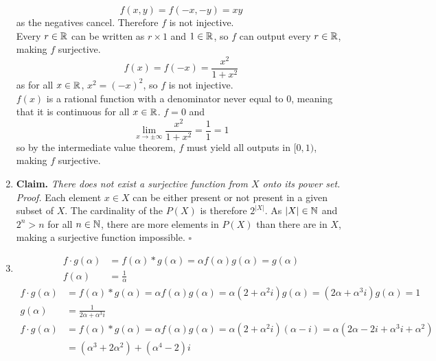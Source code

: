 \documentclass[../MATH145.tex]{subfiles}
\begin{document}
\begin{enumerate}
\begin{tasks}
\[							f(x, y) = f(-x, -y)
								= xy
						\]
						as the negatives cancel. Therefore \(f\) is not injective. \\
						Every \(r \in \mathbb{R}\) can be written as \(r \times 1\) and \(1 \in \mathbb{R}\), so \(f\) can output every \(r \in \mathbb{R}\), making \(f\) surjective.
					\task
						\[
							f(x) = f(-x)
								= \frac{x^2}{1 + x^2}
						\]
						as for all \(x \in \mathbb{R}\), \(x^2 = (-x)^2\), so \(f\) is not injective. \\
						\(f(x)\) is a rational function with a denominator never equal to 0, meaning that it is continuous for all \(x \in \mathbb{R}\). \(f = 0\) and 
							\[
								\lim_{x \to \pm\infty} \frac{x^2}{1 + x^2} = \frac{1}{1}
									= 1
							\]
							so by the intermediate value theorem, \(f\) must yield all outputs in \([0, 1)\), making \(f\) surjective.
				\end{tasks}
			\item
				\textbf{Claim.} \textit{There does not exist a surjective function from \(X\) onto its power set.} \\
					\textit{Proof.}
						Each element \(x \in X\) can be either present or not present in a given subset of \(X\). The cardinality of the \(P(X)\) is therefore \(2^{|X|}\). As \(|X| \in \mathbb{N}\) and \(2^n > n\) for all \(n \in \mathbb{N}\), there are more elements in \(P(X)\) than there are in \(X\), making a surjective function impossible. \(\square\)
			\item
				\begin{tasks}
					\task
						\begin{align*}
							f \cdot g(\alpha) &= f(\alpha) * g(\alpha)
									= \alpha f(\alpha)g(\alpha)
									= g(\alpha) \\
							f(\alpha) &= \frac{1}{\alpha}
						\end{align*}
					\task
						\begin{align*}
							f \cdot g(\alpha) &= f(\alpha) * g(\alpha)
									= \alpha f(\alpha)g(\alpha)
									= \alpha(2 + \alpha^2i)g(\alpha)
									= (2\alpha + \alpha^3i)g(\alpha)
									= 1 \\
							g(\alpha) &=  \frac{1}{2\alpha + \alpha^3i}
						\end{align*}
					\task
						\begin{align*}
							f \cdot g(\alpha) &= f(\alpha) * g(\alpha)
									= \alpha f(\alpha)g(\alpha)
									= \alpha(2 + \alpha^2i)(\alpha - i)
									= \alpha(2\alpha - 2i + \alpha^3i + \alpha^2) \\
								&= (\alpha^3 + 2\alpha^2) + (\alpha^4 - 2)i

\end{align*}
\end{tasks}
\end{enumerate}
\end{document}
